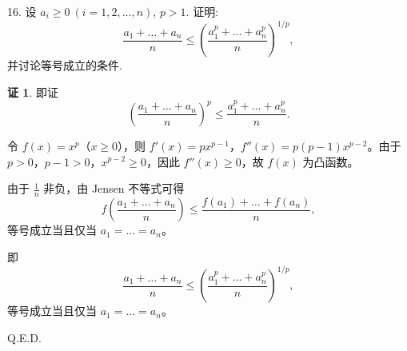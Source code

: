 \documentclass[a4paper,12pt]{article}
\theoremstyle{definition}
\newtheorem*{pf}{证}
\begin{document}
16. 设 $a_i \geq 0\ (i = 1,2,\dots,n)$, $p > 1$. 证明:
$$
    \frac{a_1 + \dots + a_n}{n} \leq \left( \frac{a_1^p + \dots + a_n^p}{n} \right)^{1/p},
$$
并讨论等号成立的条件.
\begin{pf}
    即证
    $$
        \left(\frac{a_1 + \dots + a_n}{n}\right)^p\leq\frac{a_1^p + \dots + a_n^p}{n}.
    $$

    令 $f(x)=x^p$（$x\geq 0$），则 $f'(x)=px^{p-1}$，$f''(x)=p(p-1)x^{p-2}$。由于 $p>0$，$p-1>0$，$x^{p-2}\geq0$，因此 $f''(x)\geq0$，故 $f(x)$ 为凸函数。

    由于 $\frac{1}{n}$ 非负，由 Jensen 不等式可得
    $$
        f\left(\frac{a_1+\dots+a_n}{n}\right)\leq \frac{f(a_1)+\dots+f(a_n)}{n},
    $$
    等号成立当且仅当 $a_1=\dots=a_n$。

    即
    $$
        \frac{a_1 + \dots + a_n}{n} \leq \left( \frac{a_1^p + \dots + a_n^p}{n} \right)^{1/p},
    $$
    等号成立当且仅当 $a_1 = \dots = a_n$。

    Q.E.D.
\end{pf}
\end{document}
